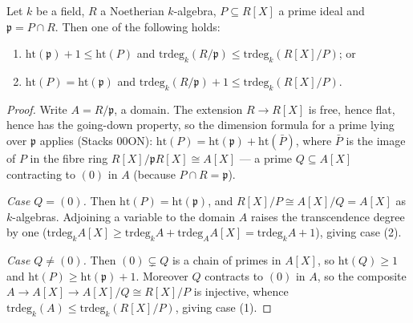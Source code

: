 \begin{lemma}
  \label{lem:polynomial_step_height_trdeg}
  \leanok
  Let \(k\) be a field, \(R\) a Noetherian \(k\)-algebra, \(P \subseteq R[X]\) a prime
  ideal and \(\mathfrak p = P \cap R\). Then one of the following holds:
  \begin{enumerate}
    \item \(\mathrm{ht}(\mathfrak p) + 1 \leq \mathrm{ht}(P)\) and
      \(\mathrm{trdeg}_k(R/\mathfrak p) \leq \mathrm{trdeg}_k(R[X]/P)\); or
    \item \(\mathrm{ht}(P) = \mathrm{ht}(\mathfrak p)\) and
      \(\mathrm{trdeg}_k(R/\mathfrak p) + 1 \leq \mathrm{trdeg}_k(R[X]/P)\).
  \end{enumerate}
\end{lemma}
\begin{proof}
  \leanok
  Write \(A = R/\mathfrak p\), a domain. The extension \(R \to R[X]\) is free, hence
  flat, hence has the going-down property, so the dimension formula for a prime lying
  over \(\mathfrak p\) applies (Stacks 00ON):
  \(\mathrm{ht}(P) = \mathrm{ht}(\mathfrak p) + \mathrm{ht}(\bar P)\), where
  \(\bar P\) is the image of \(P\) in the fibre ring
  \(R[X]/\mathfrak p R[X] \cong A[X]\) --- a prime \(Q \subseteq A[X]\) contracting to
  \((0)\) in \(A\) (because \(P \cap R = \mathfrak p\)).

  \emph{Case \(Q = (0)\).} Then \(\mathrm{ht}(P) = \mathrm{ht}(\mathfrak p)\), and
  \(R[X]/P \cong A[X]/Q = A[X]\) as \(k\)-algebras. Adjoining a variable to the domain
  \(A\) raises the transcendence degree by one
  (\(\mathrm{trdeg}_k A[X] \geq \mathrm{trdeg}_k A + \mathrm{trdeg}_A A[X]
  = \mathrm{trdeg}_k A + 1\)), giving case (2).

  \emph{Case \(Q \neq (0)\).} Then \((0) \subsetneq Q\) is a chain of primes in
  \(A[X]\), so \(\mathrm{ht}(Q) \geq 1\) and
  \(\mathrm{ht}(P) \geq \mathrm{ht}(\mathfrak p) + 1\). Moreover \(Q\) contracts to
  \((0)\) in \(A\), so the composite \(A \to A[X] \to A[X]/Q \cong R[X]/P\) is
  injective, whence
  \(\mathrm{trdeg}_k(A) \leq \mathrm{trdeg}_k(R[X]/P)\), giving case (1).
\end{proof}

